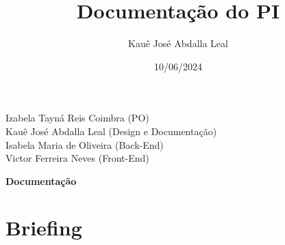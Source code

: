 \documentclass{article}
\title{Documentação do PI}
\author{Kauê José Abdalla Leal}
\date{10/06/2024}
\begin{document}
\maketitle

\begin{center} 
      Izabela Tayná Reis Coimbra (PO)\\
      Kauê José Abdalla Leal (Design e Documentação)\\
      Isabela Maria de Oliveira (Back-End)\\
      Victor Ferreira Neves (Front-End)
\end{center}

\newpage

\begin{center}
      \textbf{Documentação}
\end{center}


\section{Briefing}
\end{document}
